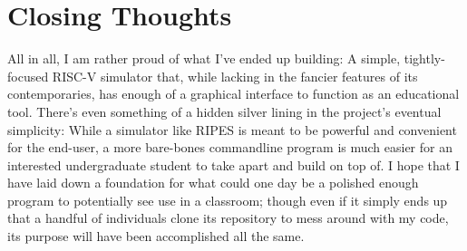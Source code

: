 \documentclass[12pt,twoside]{reedthesis}
\begin{document}
\section{Closing Thoughts}

All in all, I am rather proud of what I've ended up building: A simple, tightly-focused RISC-V simulator that, while lacking in the fancier features of its contemporaries, has enough of a graphical interface to function as an educational tool. There's even something of a hidden silver lining in the project's eventual simplicity: While a simulator like RIPES is meant to be powerful and convenient for the end-user, a more bare-bones commandline program is much easier for an interested undergraduate student to take apart and build on top of. I hope that I have laid down a foundation for what could one day be a polished enough program to potentially see use in a classroom; though even if it simply ends up that a handful of individuals clone its repository to mess around with my code, its purpose will have been accomplished all the same.
\end{document}
